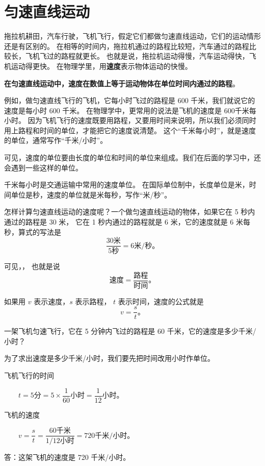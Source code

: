 \section{匀速直线运动}\label{sec:3-3}

拖拉机耕田，汽车行驶，飞机飞行，假定它们都做匀速直线运动，它们的运动情形还是有区别的。
在相等的时间内，拖拉机通过的路程比较短，汽车通过的路程比较长，飞机飞过的路程就更长。
也就是说，拖拉机运动得慢，汽车运动得快，飞机运动得更快。
在物理学里，用\textbf{速度}表示物体运动的快慢。

\textbf{在匀速直线运动中，速度在数值上等于运动物体在单位时间内通过的路程}。

例如，做匀速直线飞行的飞机，它每小时飞过的路程是 600 千米，我们就说它的速度是每小时 600 千米。
在物理学中，更常用的说法是飞机的速度是 600千米每小时。
因为飞机飞行的速度既要用路程，又要用时间来说明，所以我们必须同时用上路程和时间的单位，才能把它的速度说清楚。
这个“千米每小时”，就是速度的单位，通常写作“千米/小时”。

可见，速度的单位要由长度的单位和时间的单位来组成。我们在后面的学习中，还会遇到一些这样的单位。

千米每小时是交通运输中常用的速度单位。
在国际单位制中，长度单位是米，时间单位是秒，速度的单位就是米每秒，写作“米/秒”。

怎样计算匀速直线运动的速度呢？一个做匀速直线运动的物体，如果它在 5 秒内通过的路程是 30 米，
它在 1 秒内通过的路程就是 6 米，它的速度就是 6 米每秒，算式的写法是
$$ \dfrac{30\text{米}}{5\text{秒}} = 6 \text{米/秒。}$$

可见，，
也就是说
$$ \text{速度} = \dfrac{\text{路程}}{\text{时间}}\text{。} $$

如果用 $v$ 表示速度，$s$ 表示路程， $t$ 表示时间，速度的公式就是
$$ v = \dfrac{s}{t} \text{。}$$

\liti 一架飞机匀速飞行，它在 5 分钟内飞过的路程是 60 千米，它的速度是多少千米/小时？

为了求出速度是多少千米/小时，我们要先把时间改用小时作单位。

\jie 飞机飞行的时间

$ \qquad t = 5\text{分} = 5 \times \dfrac{1}{60}\text{小时} = \dfrac{1}{12}\text{小时。} $

飞机的速度

$ \qquad v = \dfrac{s}{t} = \dfrac{60\text{千米}}{1 / 12 \text{小时}} = 720 \text{千米/小时。} $

答：这架飞机的速度是 720 千米/小时。


